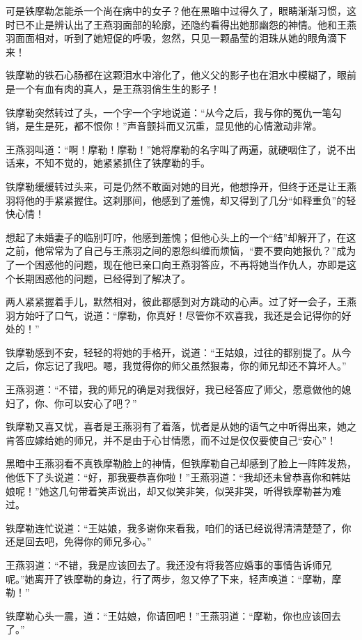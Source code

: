 \documentclass[12pt,oneside]{book}
\begin{document}
可是铁摩勒怎能杀一个尚在病中的女子？他在黑暗中过得久了，眼睛渐渐习惯，这时已不止是辨认出了王燕羽面部的轮廓，还隐约看得出她那幽怨的神情。他和王燕羽面面相对，听到了她短促的呼吸，忽然，只见一颗晶莹的泪珠从她的眼角滴下来！

铁摩勒的铁石心肠都在这颗泪水中溶化了，他义父的影子也在泪水中模糊了，眼前是一个有血有肉的真人，是王燕羽俏生生的影子！

铁摩勒突然转过了头，一个字一个字地说道：``从今之后，我与你的冤仇一笔勾销，是生是死，都不恨你！''声音颤抖而又沉重，显见他的心情激动非常。

王燕羽叫道：``啊！摩勒！摩勒！''她将摩勒的名字叫了两遍，就硬咽住了，说不出话来，不知不觉的，她紧紧抓住了铁摩勒的手。

铁摩勒缓缓转过头来，可是仍然不敢面对她的目光，他想挣开，但终于还是让王燕羽将他的手紧紧握住。这刹那间，他感到了羞愧，却又得到了几分``如释重负''的轻快心情！

想起了未婚妻子的临别叮咛，他感到羞愧；但他心头上的一个``结''却解开了，在这之前，他常常为了自己与王燕羽之间的恩怨纠缠而烦恼，``要不要向她报仇？''成为了一个困惑他的问题，现在他已亲口向王燕羽答应，不再将她当作仇人，亦即是这个长期困惑他的问题，已经得到了解决了。

两人紧紧握着手儿，默然相对，彼此都感到对方跳动的心声。过了好一会子，王燕羽方始吁了口气，说道：``摩勒，你真好！尽管你不欢喜我，我还是会记得你的好处的！''

铁摩勒感到不安，轻轻的将她的手格开，说道：``王姑娘，过往的都别提了。从今之后，你忘记了我吧。嗯，我觉得你的师父虽然狠毒，你的师兄却还不算坏人。''

王燕羽道：``不错，我的师兄的确是对我很好，我已经答应了师父，愿意做他的媳妇了，你、你可以安心了吧？''

铁摩勒又喜又忧，喜者是王燕羽有了着落，忧者是从她的语气之中听得出来，她之肯答应嫁给她的师兄，并不是由于心甘情愿，而不过是仅仅要使自己``安心''！

黑暗中王燕羽看不真铁摩勒脸上的神情，但铁摩勒自己却感到了脸上一阵阵发热，他低下了头说道：``好，那我要恭喜你啦！''王燕羽道：``我却还未曾恭喜你和韩姑娘呢！''她这几句带着笑声说出，却又似笑非笑，似哭非哭，听得铁摩勒甚为难过。

铁摩勒连忙说道：``王姑娘，我多谢你来看我，咱们的话已经说得清清楚楚了，你还是回去吧，免得你的师兄多心。''

王燕羽道：``不错，我是应该回去了。我还没有将我答应婚事的事情告诉师兄呢。''她离开了铁摩勒的身边，行了两步，忽又停了下来，轻声唤道：``摩勒，摩勒！''

铁摩勒心头一震，道：``王姑娘，你请回吧！''王燕羽道：``摩勒，你也应该回去了。''
\end{document}
